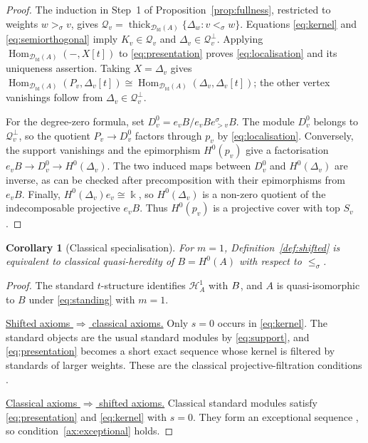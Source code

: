 \documentclass[11pt,a4paper]{article}
\newcommand{\D}{\mathcal D}
\renewcommand{\H}{\mathcal H}
\newcommand{\std}{\Delta}
\DeclareMathOperator{\fd}{fd}
\DeclareMathOperator{\Hom}{Hom}
\DeclareMathOperator{\thick}{thick}
\let\mod\relax
\DeclareMathOperator{\mod}{mod}
\theoremstyle{plain}
\newtheorem{corollary}[theorem]{Corollary}
\theoremstyle{definition}
\numberwithin{equation}{section}
\begin{document}
\begin{proof}
The induction in Step~1 of Proposition~\ref{prop:fullness}, restricted
to weights $w>_\sigma v$, gives
$\mathcal Q_v=\thick_{\D_{\fd}(A)}\{\std_w:v<_\sigma w\}$.
Equations \eqref{eq:kernel} and \eqref{eq:semiorthogonal} imply
$K_v\in\mathcal Q_v$ and $\std_v\in\mathcal Q_v^\perp$.
Applying $\Hom_{\D_{\fd}(A)}(-,X[t])$ to
\eqref{eq:presentation} proves \eqref{eq:localisation} and its
uniqueness assertion. Taking $X=\std_v$ gives
$\Hom_{\D_{\fd}(A)}(P_v,\std_v[t])\cong
\Hom_{\D_{\fd}(A)}(\std_v,\std_v[t])$; the other vertex vanishings
follow from $\std_v\in\mathcal Q_v^\perp$.

For the degree-zero formula, set $D_v^0=e_vB/e_vBe_{>v}^\sigma B$.
The module $D_v^0$ belongs to $\mathcal Q_v^\perp$, so the quotient
$P_v\to D_v^0$ factors through $p_v$ by \eqref{eq:localisation}.
Conversely, the support vanishings and the epimorphism $H^0(p_v)$
give a factorisation $e_vB\to D_v^0\to H^0(\std_v)$.
The two induced maps between $D_v^0$ and $H^0(\std_v)$ are inverse,
as can be checked after precomposition with their epimorphisms from
$e_vB$. Finally, $H^0(\std_v)e_v\cong\Bbbk$, so $H^0(\std_v)$ is a
non-zero quotient of the indecomposable projective $e_vB$.
Thus $H^0(p_v)$ is a projective cover with top $S_v$.
\end{proof}

\begin{corollary}[Classical specialisation]\label{cor:classical}
For $m=1$, Definition~\ref{def:shifted} is equivalent to classical
quasi-heredity of $B=H^0(A)$ with respect to $\leq_\sigma$.
\end{corollary}
\begin{proof}
The standard $t$-structure identifies $\H_A^1$ with $\mod B$, and
$A$ is quasi-isomorphic to $B$ under \eqref{eq:standing} with $m=1$.

\noindent\underline{Shifted axioms $\Rightarrow$ classical axioms.}
Only $s=0$ occurs in \eqref{eq:kernel}. The standard objects are the
usual standard modules by \eqref{eq:support}, and
\eqref{eq:presentation} becomes a short exact sequence whose kernel
is filtered by standards of larger weights. These are the classical
projective-filtration conditions \cite[\S3]{Kra17}.

\noindent\underline{Classical axioms $\Rightarrow$ shifted axioms.}
Classical standard modules satisfy \eqref{eq:presentation} and
\eqref{eq:kernel} with $s=0$. They form an exceptional sequence
\cite[Lemma 2.2]{BB26}, so condition~\ref{ax:exceptional} holds.
\end{proof}
\end{document}
